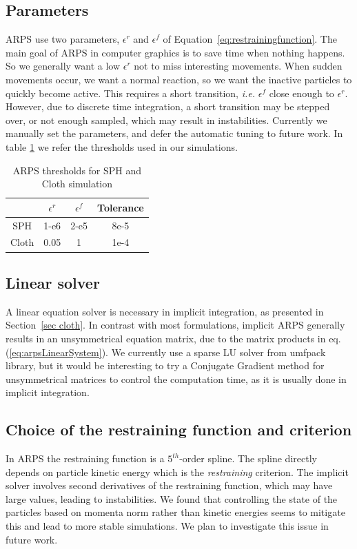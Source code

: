 \documentclass[11pt, oneside, a4paper]{memoir}
\begin{document}
\subsection{ Parameters }
ARPS use two parameters, $\epsilon^{r}$ and $\epsilon^{f}$ of Equation~\ref{eq:restrainingfunction}.
The main goal of ARPS in computer graphics is to save time when nothing happens.
So we generally want a low $\epsilon^{r}$ not to miss interesting movements.
When sudden movements occur, we want a normal reaction, so we want the inactive particles to quickly become active.
This requires a short transition, \textit{i.e.} $\epsilon^{f}$ close enough to $\epsilon^{r}$.
However, due to discrete time integration, a short transition may be stepped over, or not enough sampled, which may result in instabilities.
Currently we manually set the parameters, and defer the automatic tuning to future work.
In table \ref{tab:parameters} we refer the thresholds used in our simulations.
\begin{table}[htb]
    \centering
    \begin{tabular}{|c|c|c|c|} \hline
                & $\epsilon^{r}$    & $\epsilon^{f}$ & Tolerance \\ \hline
        SPH     &   1-e6            & 2-e5          & 8e-5 \\ \hline
        Cloth  &   0.05            & 1             & 1e-4 \\ \hline
\end{tabular}
    \caption{\label{tab:parameters} ARPS thresholds for SPH and Cloth simulation}
\end{table}

\subsection{Linear solver}
A linear equation solver is necessary in implicit integration, as presented in Section~\ref{sec cloth}.
In contrast with most formulations, implicit ARPS generally results in an unsymmetrical equation matrix, due to the matrix products in eq.(\ref{eq:arpsLinearSystem}).
We currently use a sparse LU solver from umfpack library, but it would be interesting to try a Conjugate Gradient method for unsymmetrical matrices to control the computation time, as it is usually done in implicit integration.

\subsection{Choice of the restraining function and criterion}
In ARPS the restraining function is a $5^{th}$-order spline.
The spline directly depends on particle kinetic energy which is the \emph{restraining} criterion.
The implicit solver involves second derivatives of the restraining function, which may have large values, leading to instabilities.
We found that controlling the state of the particles based on momenta norm rather than kinetic energies seems to mitigate this and lead to more stable simulations.
We plan to investigate this issue in future work.
\end{document}
